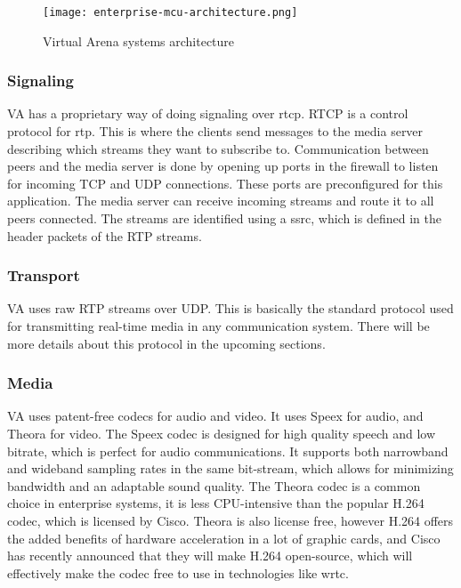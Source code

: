 \begin{figure}[here]
\centerline{\texttt{[image: enterprise-mcu-architecture.png]}}
\caption{Virtual Arena systems architecture}
\label{fig:vsva-architecture}
\end{figure}

\subsubsection{Signaling}
VA has a proprietary way of doing signaling over \gls{rtcp}. RTCP is a control protocol for \gls{rtp}. This is where the clients send messages to the media server describing which streams they want to subscribe to. Communication between peers and the media server is done by opening up ports in the firewall to listen for incoming TCP and UDP connections. These ports are preconfigured for this application. The media server can receive incoming streams and route it to all peers connected. The streams are identified using a \gls{ssrc}, which is defined in the header packets of the RTP streams.

\subsubsection{Transport}
VA uses raw RTP streams over UDP. This is basically the standard protocol used for transmitting real-time media in any communication system. There will be more details about this protocol in the upcoming sections.

\subsubsection{Media}
VA uses patent-free codecs for audio and video. It uses Speex for audio, and Theora for video. The Speex codec is designed for high quality speech and low bitrate, which is perfect for audio communications. It supports both narrowband and wideband sampling rates in the same bit-stream\cite{speex}, which allows for minimizing bandwidth and an adaptable sound quality. The Theora codec is a common choice in enterprise systems, it is less CPU-intensive than the popular H.264 codec\cite{theora}, which is licensed by Cisco. Theora is also license free, however H.264 offers the added benefits of hardware acceleration in a lot of graphic cards, and Cisco has recently announced that they will make H.264 open-source\cite{h264-free}, which will effectively make the codec free to use in technologies like \gls{wrtc}.

